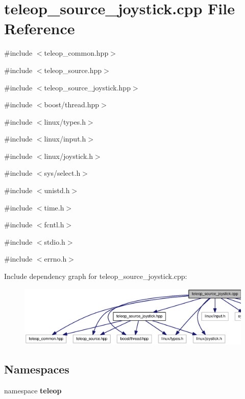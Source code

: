 \section{teleop\_\-source\_\-joystick.cpp File Reference}
\label{teleop__source__joystick_8cpp}
{\ttfamily \#include $<$teleop\_\-common.hpp$>$}\par
{\ttfamily \#include $<$teleop\_\-source.hpp$>$}\par
{\ttfamily \#include $<$teleop\_\-source\_\-joystick.hpp$>$}\par
{\ttfamily \#include $<$boost/thread.hpp$>$}\par
{\ttfamily \#include $<$linux/types.h$>$}\par
{\ttfamily \#include $<$linux/input.h$>$}\par
{\ttfamily \#include $<$linux/joystick.h$>$}\par
{\ttfamily \#include $<$sys/select.h$>$}\par
{\ttfamily \#include $<$unistd.h$>$}\par
{\ttfamily \#include $<$time.h$>$}\par
{\ttfamily \#include $<$fcntl.h$>$}\par
{\ttfamily \#include $<$stdio.h$>$}\par
{\ttfamily \#include $<$errno.h$>$}\par
Include dependency graph for teleop\_\-source\_\-joystick.cpp:
\nopagebreak
\begin{figure}[H]
\begin{center}
\leavevmode
\includegraphics[width=400pt]{teleop__source__joystick_8cpp__incl}
\end{center}
\end{figure}
\subsection*{Namespaces}
\begin{DoxyCompactItemize}
\item 
namespace {\bf teleop}
\end{DoxyCompactItemize}
